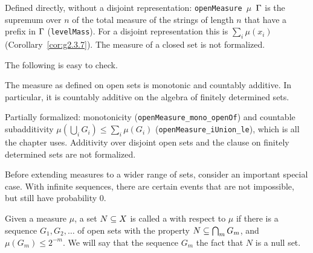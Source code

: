 \begin{formalization}
Defined directly, without a disjoint representation: \texttt{openMeasure \( \mu \) \( \Gamma \)} is
the supremum over \( n \) of the total measure of the strings of length \( n \) that have a
prefix in \( \Gamma \) (\texttt{levelMass}). For a disjoint representation this is
\( \sum_{i} \mu(x_{i}) \) (Corollary~\ref{cor:g2.3.7}). The measure of a closed set is not
formalized.
\end{formalization}

The following is easy to check.

\begin{proposition}
  \label{prop:g2.3.9}
The measure as defined on open sets is monotonic and
countably additive.
In particular, it is countably additive
on the algebra of finitely determined sets.
\end{proposition}

\begin{formalization}
Partially formalized: monotonicity (\texttt{openMeasure\_mono\_openOf}) and countable
subadditivity \( \mu(\bigcup_{i} G_{i}) \le \sum_{i} \mu(G_{i}) \)
(\texttt{openMeasure\_iUnion\_le}), which is all the chapter uses. Additivity over disjoint
open sets and the clause on finitely determined sets are not formalized.
\end{formalization}

Before extending measures to a wider range of sets, consider an important
special case.
With infinite sequences, there are certain events that are not impossible, but
still have probability 0.

\begin{definition}
  \label{def:g2.3.10}
  \leanok
Given a measure \( \mu \), a set \( N\subseteq X \) is called a  with respect
to \( \mu \)
if there is a sequence \( G_{1},G_{2},\dots \) of open sets with the property
\( N\subseteq \bigcap_{m}G_{m} \), and \( \mu(G_{m})\le 2^{-m} \).
We will say that the sequence \( G_{m} \)  the fact that \( N \) is a null set.
\end{definition}

